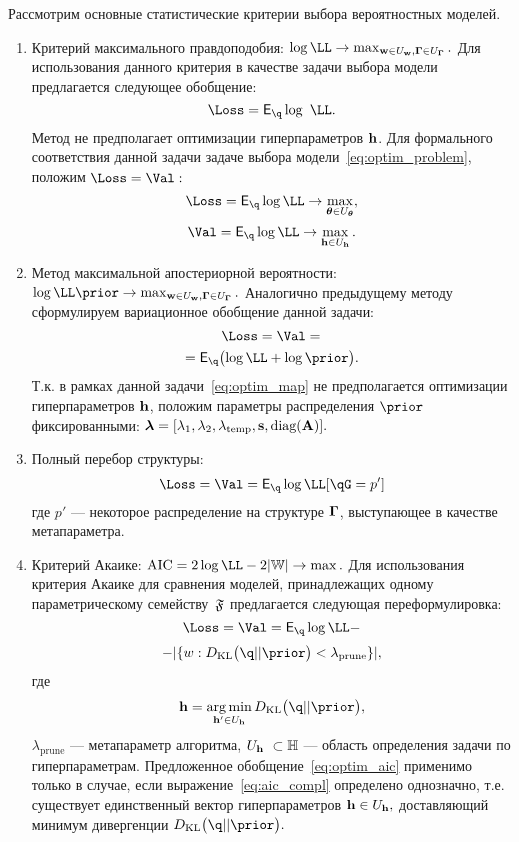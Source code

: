 \documentclass[11pt, a5paper]{dissert}
\theoremstyle{definition}
\DeclareMathOperator*{\argmin}{arg\,min}
\begin{document}
{Рассмотрим основные статистические критерии выбора вероятностных моделей. 
\begin{enumerate}
\item Критерий максимального правдоподобия:
$\log \LL \to \max_{\w \in \Uw, \G \in \UG}.$
Для использования данного критерия в качестве задачи выбора модели предлагается следующее обобщение:
\begin{equation}
\label{eq:optim_ml}
    \Loss =  \E_{\q} \log~\LL.
\end{equation}
Метод не предполагает оптимизации гиперпараметров $\mathbf{h}$. Для формального соответствия данной задачи задаче выбора модели~\eqref{eq:optim_problem}, положим $\Loss=\Val:$
\[
    \Loss =  \E_{\q}\log \LL \to \max_{\teta \in \Uteta},
\]
\[
    \Val =  \E_{\q}\log \LL \to \max_{\h \in \Uh}.
\]



\item Метод максимальной апостериорной вероятности:
$\log \LL \prior \to \max_{\w  \in \Uw, \G \in \UG}.$
Аналогично предыдущему методу сформулируем вариационное обобщение данной задачи:
\begin{equation}
\label{eq:optim_map}
\Loss = \Val = 
\end{equation}
\[
 = \E_{\q} \bigl( \log\LL + \log\prior \bigr).
\]
Т.к. в рамках данной задачи~\eqref{eq:optim_map} не предполагается оптимизации гиперпараметров $\mathbf{h}$, положим параметры распределения $\prior$ фиксированными:
$
   \boldsymbol{\lambda} = [\lambda_1, \lambda_2, \lambda_{\text{temp}}, \mathbf{s}, \text{diag}(\mathbf{A})].
$

\item Полный перебор структуры:
\begin{equation}
\label{eq:optim_struct}
    \Loss = \Val = \E_{\q} \log \LL [\qG = p']
\end{equation}
где $p'$ --- некоторое распределение на структуре $\boldsymbol{\Gamma}$, выступающее в качестве метапараметра.




\item Критерий Акаике:
$
   \text{AIC} =  2\log \LL - 2|\Wb| \to \max.
$
Для использования критерия Акаике для сравнения моделей, принадлежащих одному параметрическому семейству~$\mathfrak{F}$ предлагается следующая переформулировка:
\begin{equation}
\label{eq:optim_aic}
    \Loss = \Val = \E_{\q}\log \LL - 
\end{equation}
\[
 - |\{w: \KL{\q}{\prior}<\lambda_\text{prune}\}|,
\]
где 
\begin{equation}\label{eq:aic_compl}\h=\argmin_{\h' \in \Uh} \KL{\q}{\prior},\end{equation} $\lambda_{\text{prune}}$ --- метапараметр алгоритма, $\Uh  \subset \Hb$ --- область определения задачи по гиперпараметрам. Предложенное обобщение~\eqref{eq:optim_aic} применимо только в случае, если выражение~\eqref{eq:aic_compl} определено однозначно, т.е. существует единственный вектор гиперпараметров  $\mathbf{h} \in U_{\mathbf{h}},$ доставляющий минимум дивергенции $\KL{\q}{\prior}.$


\end{enumerate}}
\end{document}
